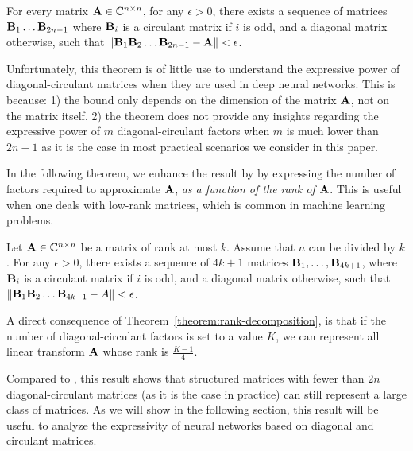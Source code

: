 \begin{theorem} \label{theorem:huhtanen}
  For every matrix $\mathbf{A} \in {\ensuremath \mathbb{C}}^{n \times n}$, for any $\epsilon > 0$, there exists a sequence of matrices $\mathbf{B}_1 \ldots \mathbf{B}_{2n-1}$ where $\mathbf{B}_{i}$ is a circulant matrix if $i$ is odd, and a diagonal matrix otherwise, such that $\norm{\mathbf{B}_{1} \mathbf{B}_{2} \ldots \mathbf{B}_{2n-1} - \mathbf{A}} < \epsilon$.
\end{theorem}

Unfortunately, this theorem is of little use to understand the expressive power of diagonal-circulant matrices when they are used in deep neural networks.
This is because: 1) the bound only depends on the dimension of the matrix $\mathbf{A}$, not on the matrix itself, 2) the theorem does not provide any insights regarding the expressive power of $m$ diagonal-circulant factors when $m$ is much lower than $2n - 1$ as it is the case in most practical scenarios we consider in this paper. 

In the following theorem, we enhance the result by \citet{Huhtanen2015} by expressing the number of factors required to approximate $\mathbf{A}$, \emph{as a function of the rank of $\mathbf{A}$}.
This is useful when one deals with low-rank matrices, which is common in machine learning problems. 

\begin{theorem} \label{theorem:rank-decomposition}
Let $\mathbf{A} \in {\ensuremath \mathbb{C}}^{n \times n}$ be a matrix of rank at most $k$.
Assume that $n$ can be divided by $k$.
For any $\epsilon > 0$, there exists a sequence of $4k+1$ matrices $\mathbf{B}_{1}, \ldots, \mathbf{B}_{4k+1}$, where $\mathbf{B}_{i}$ is a circulant matrix if $i$ is odd, and a diagonal matrix otherwise, such that $\norm{\mathbf{B}_1 \mathbf{B}_2 \ldots \mathbf{B}_{4k+1} - A} < \epsilon$.
\end{theorem}

A direct consequence of Theorem~\ref{theorem:rank-decomposition}, is that if the number of diagonal-circulant factors is set to a value $K$, we can represent all linear transform $\mathbf{A}$ whose rank is $\frac{K - 1}{4}$.

Compared to \cite{Huhtanen2015}, this result shows that structured matrices with fewer than $2n$ diagonal-circulant matrices (as it is the case in practice) can still represent a large class of matrices.
As we will show in the following section, this result will be useful to analyze the expressivity of neural networks based on diagonal and circulant matrices.


